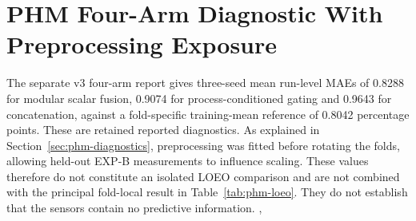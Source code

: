 \section{PHM Four-Arm Diagnostic With Preprocessing Exposure}
\label{sec:phm-fourarm-supplement}
The separate v3 four-arm report gives three-seed mean run-level MAEs of 0.8288 for
modular scalar fusion, 0.9074 for process-conditioned gating and 0.9643 for
concatenation, against a fold-specific training-mean reference of 0.8042 percentage
points. These are retained reported diagnostics. As explained in
Section~\ref{sec:phm-diagnostics}, preprocessing was fitted before rotating the folds,
allowing held-out EXP-B measurements to influence scaling. These values therefore do
not constitute an isolated LOEO comparison and are not combined with the principal
fold-local result in Table~\ref{tab:phm-loeo}. They do not establish that the sensors
contain no predictive information.
{, }
